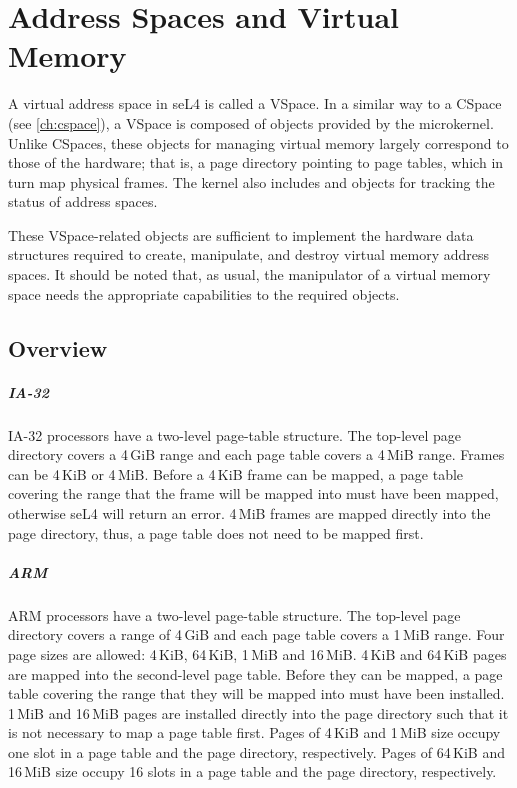 %
%
%
%

\chapter{\label{ch:vspace}Address Spaces and Virtual Memory}

A virtual address space in seL4 is called a VSpace. In a similar
way to a CSpace (see \autoref{ch:cspace}), a VSpace is composed of objects 
provided by the microkernel. Unlike CSpaces, these objects for managing
virtual memory largely correspond to those of the hardware;
that is, a page directory pointing to page tables, which in turn map
physical frames.  The kernel also includes  and
 objects for tracking the status of address spaces.

These VSpace-related objects are sufficient to implement the
hardware data structures required to create, manipulate, and destroy
virtual memory address spaces. It should be noted that, as usual, the
manipulator of a virtual memory space needs the appropriate
capabilities to the required objects.

\section{Overview}
\ifxeightsix
\paragraph{IA-32}

IA-32 processors have a two-level page-table structure.
The top-level page directory covers a 4\,GiB range and each page table covers a 4\,MiB range.
Frames can be 4\,KiB or 4\,MiB.
Before a 4\,KiB
frame can be mapped, a page table covering the range that the frame will
be mapped into must have been mapped, otherwise seL4 will return an
error.
4\,MiB frames are mapped directly into the page directory, thus,
a page table does not need to be mapped first.
\fi

\paragraph{ARM}

ARM processors \fi have a two-level page-table structure.
The top-level page directory covers a range of 4\,GiB and each page table covers a 1\,MiB range.
Four page sizes are allowed: 4\,KiB, 64\,KiB, 1\,MiB and 16\,MiB.
4\,KiB and 64\,KiB pages are mapped into the second-level page table.
Before
they can be mapped, a page table covering the range that they will be
mapped into must have been installed.
1\,MiB and 16\,MiB pages are installed directly into the page directory such that it is not necessary to map a page table first.
Pages of 4\,KiB and 1\,MiB size occupy one slot in a page table and the page directory, respectively.
Pages of 64\,KiB and 16\,MiB size occupy 16 slots in a page table and the page directory, respectively.



